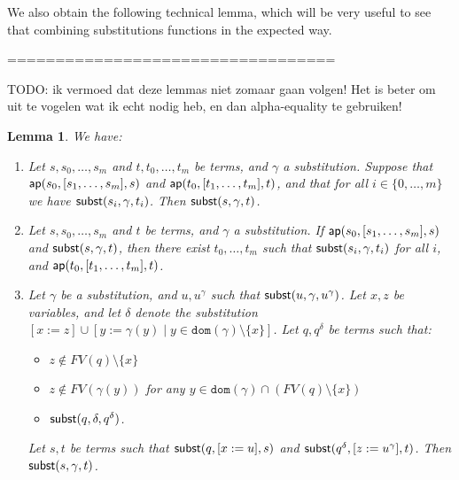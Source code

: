 \documentclass{lmcs}
\theoremstyle{theorem}\newtheorem{theorem}[dummy]{Theorem}
\theoremstyle{theorem}\newtheorem{lemma}[dummy]{Lemma}
\theoremstyle{theorem}\newtheorem{corollary}[dummy]{Corollary}
\theoremstyle{definition}\newtheorem{definition}[dummy]{Definition}
\theoremstyle{definition}\newtheorem{example}[dummy]{Example}
\newcommand{\FV}{\mathit{FV}}
\newcommand{\domain}{\mathtt{dom}}
\begin{document}
We also obtain the following technical lemma, which will be very useful to see that combining
substitutions functions in the expected way.

==================================

TODO: ik vermoed dat deze lemmas niet zomaar gaan volgen! Het is beter om uit te vogelen wat ik
echt nodig heb, en dan alpha-equality te gebruiken!


\begin{lemma}\label{lem:applicationsubstitution}
We have:
\begin{enumerate}
\item\label{lem:applicationsubstitution:ap} Let $s,s_0,\dots,s_m$ and $t,t_0,\dots,t_m$ be terms,
  and $\gamma$ a substitution.  Suppose that $\mathsf{ap}(s_0,[s_1,\dots,s_m],s)$ and $\mathsf{ap}(t_0,
  [t_1,\dots,t_m],t)$, and that for all $i \in \{0,\dots,m\}$ we have
  $\mathsf{subst}(s_i,\gamma,t_i)$.
  Then $\mathsf{subst}(s,\gamma,t)$.
\item\label{lem:applicationsubstitution:apex} Let $s,s_0,\dots,s_m$ and $t$ be terms, and
  $\gamma$ a substitution.  If $\mathsf{ap}(s_0,[s_1,\dots,s_m],s)$ and $\mathsf{subst}(s,\gamma,t)$,
  then there exist $t_0,\dots,t_m$ such that $\mathsf{subst}(s_i,\gamma,t_i)$ for all $i$, and
  $\mathsf{ap}(t_0,[t_1,\dots,t_m],t)$.
\item\label{lem:applicationsubstitution:sub}
  Let $\gamma$ be a substitution, and $u,u^\gamma$ such that $\mathsf{subst}(u,\gamma,u^\gamma)$.
  Let $x,z$ be variables, and let $\delta$ denote the substitution $[x:=z] \cup [y:=\gamma(y)
  \mid y \in \domain(\gamma) \setminus \{x\}]$.
  Let $q,q^\delta$ be terms such that:
  \begin{itemize}
  \item $z \notin \FV(q) \setminus \{x\}$
  \item $z \notin \FV(\gamma(y))$ for any $y \in \domain(\gamma) \cap (\FV(q) \setminus \{x\})$
  \item $\mathsf{subst}(q,\delta,q^\delta)$. \\
  \end{itemize}
  Let $s,t$ be terms such that $\mathsf{subst}(q,[x:=u],s)$ and $\mathsf{subst}(q^\delta,[z:=u^\gamma],t)$.
  Then $\mathsf{subst}(s,\gamma,t)$.
\end{enumerate}
\end{lemma}
\end{document}
